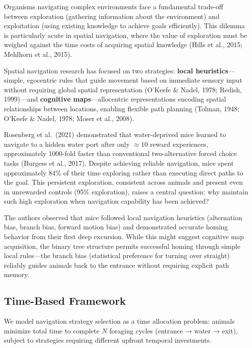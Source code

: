 Organisms navigating complex environments face a fundamental trade-off between exploration (gathering information about the environment) and exploitation (using existing knowledge to achieve goals efficiently). This dilemma is particularly acute in spatial navigation, where the value of exploration must be weighed against the time costs of acquiring spatial knowledge (Hills et al., 2015; Mehlhorn et al., 2015).

Spatial navigation research has focused on two strategies: \textbf{local heuristics}—simple, egocentric rules that guide movement based on immediate sensory input without requiring global spatial representation (O'Keefe \& Nadel, 1978; Redish, 1999)—and \textbf{cognitive maps}—allocentric representations encoding spatial relationships between locations, enabling flexible path planning (Tolman, 1948; O'Keefe \& Nadel, 1978; Moser et al., 2008).

Rosenberg et al.\ (2021) demonstrated that water-deprived mice learned to navigate to a hidden water port after only $\approx 10$ reward experiences, approximately 1000-fold faster than conventional two-alternative forced choice tasks (Burgess et al., 2017). Despite achieving reliable navigation, mice spent approximately 84\% of their time exploring rather than executing direct paths to the goal. This persistent exploration, consistent across animals and present even in unrewarded controls (95\% exploration), raises a central question: why maintain such high exploration when navigation capability has been achieved?

The authors observed that mice followed local navigation heuristics (alternation bias, branch bias, forward motion bias) and demonstrated accurate homing behavior from their first deep excursion. While this might suggest cognitive map acquisition, the binary tree structure permits successful homing through simple local rules—the branch bias (statistical preference for turning over straight) reliably guides animals back to the entrance without requiring explicit path memory.

\subsection{Time-Based Framework}

We model navigation strategy selection as a time allocation problem: animals minimize total time to complete $N$ foraging cycles (entrance → water → exit), subject to strategies requiring different upfront temporal investments.

